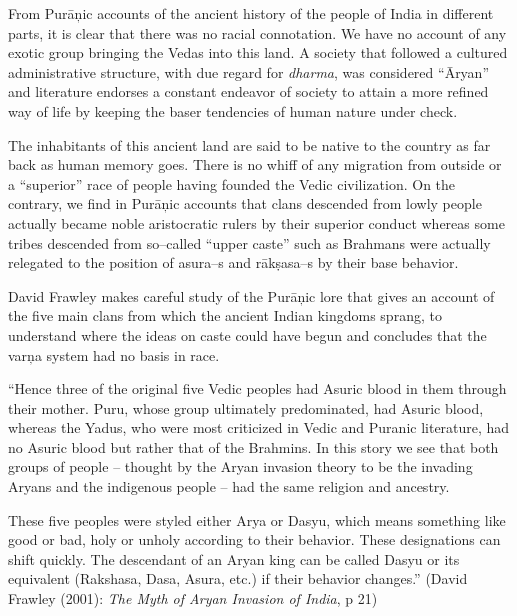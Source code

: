 From Purāņic accounts of the ancient history of the people of India in different parts, it is clear that there was no racial connotation. We have no account of any exotic group bringing the Vedas into this land. A society that followed a cultured administrative structure, with due regard for \textit{dharma}, was considered “Āryan” and literature endorses a constant endeavor of society to attain a more refined way of life by keeping the baser tendencies of human nature under check.

The inhabitants of this ancient land are said to be native to the country as far back as human memory goes. There is no whiff of any migration from outside or a “superior” race of people having founded the Vedic civilization. On the contrary, we find in Purāņic accounts that clans descended from lowly people actually became noble aristocratic rulers by their superior conduct whereas some tribes descended from so–called “upper caste” such as Brahmans were actually relegated to the position of asura–s and rākṣasa–s by their base behavior.

David Frawley makes careful study of the Purāņic lore that gives an account of the five main clans from which the ancient Indian kingdoms sprang, to understand where the ideas on caste could have begun and concludes that the varņa system had no basis in race.

\begin{myquote}
“Hence three of the original five Vedic peoples had Asuric blood in them through their mother. Puru, whose group ultimately predominated, had Asuric blood, whereas the Yadus, who were most criticized in Vedic and Puranic literature, had no Asuric blood but rather that of the Brahmins. In this story we see that both groups of people – thought by the Aryan invasion theory to be the invading Aryans and the indigenous people – had the same religion and ancestry.
\end{myquote}

\begin{myquote}
These five peoples were styled either Arya or Dasyu, which means something like good or bad, holy or unholy according to their behavior. These designations can shift quickly. The descendant of an Aryan king can be called Dasyu or its equivalent (Rakshasa, Dasa, Asura, etc.) if their behavior changes.” (David Frawley (2001): \textit{The Myth of Aryan Invasion of India}, p 21)
\end{myquote}

